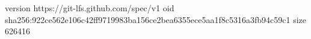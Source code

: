 version https://git-lfs.github.com/spec/v1
oid sha256:922ce562e106c42ff9719983ba156ce2bea6355ece5aa1f8c5316a3fb94c59c1
size 626416
